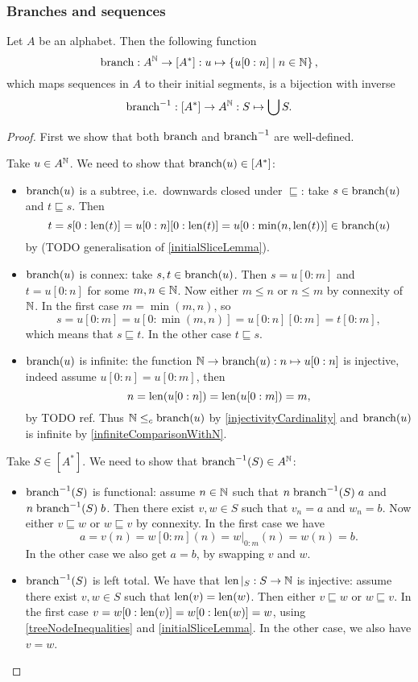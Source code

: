 \subsubsection{Branches and sequences}
\begin{proposition}
Let $A$ be an alphabet. Then the following function
\[ \operatorname{branch}: A^{\mathbb{N}} \to [A^*]: u \mapsto \left\{ u[0:n] \;\middle|\; n\in \mathbb{N} \right\}, \]
which maps sequences in $A$ to their initial segments, is a bijection with inverse
\[ \operatorname{branch}^{-1}: [A^*] \to A^{\mathbb{N}}: S\mapsto \bigcup S. \]
\end{proposition}
\begin{proof}
First we show that both $\operatorname{branch}$ and $\operatorname{branch}^{-1}$ are well-defined.

Take $u\in A^{\mathbb{N}}$. We need to show that $\operatorname{branch}(u)\in[A^*]$:
\begin{itemize}
\item $\operatorname{branch}(u)$ is a subtree, i.e.\ downwards closed under $\sqsubseteq$: take $s\in \operatorname{branch}(u)$ and $t\sqsubseteq s$. Then 
\[ t = s[0:\operatorname{len}(t)] = u[0:n][0:\operatorname{len}(t)] = u[0:\min(n, \operatorname{len}(t))] \in \operatorname{branch}(u) \]
by (TODO generalisation of \ref{initialSliceLemma}).
\item $\operatorname{branch}(u)$ is connex: take $s,t\in \operatorname{branch}(u)$. Then $s = u[0:m]$ and $t = u[0:n]$ for some $m,n\in \mathbb{N}$. Now either $m\leq n$ or $n\leq m$ by connexity of $\mathbb{N}$. In the first case $m = \min(m,n)$, so
\[ s = u[0:m] = u[0:\min(m,n)] = u[0:n][0:m] = t[0:m], \]
which means that $s\sqsubseteq t$. In the other case $t\sqsubseteq s$.
\item $\operatorname{branch}(u)$ is infinite: the function $\mathbb{N}\to \operatorname{branch}(u): n\mapsto u[0:n]$ is injective, indeed assume $u[0:n] = u[0:m]$, then
\[ n = \operatorname{len}(u[0:n]) = \operatorname{len}(u[0:m]) = m, \]
by TODO ref. Thus $\mathbb{N}\leq_c \operatorname{branch}(u)$ by \ref{injectivityCardinality} and $\operatorname{branch}(u)$ is infinite by \ref{infiniteComparisonWithN}.
\end{itemize}

Take $S\in [A^*]$. We need to show that $\operatorname{branch}^{-1}(S)\in A^{\mathbb{N}}$:
\begin{itemize}
\item $\operatorname{branch}^{-1}(S)$ is functional: assume $n\in \mathbb{N}$ such that $n\mathrel{\operatorname{branch}^{-1}(S)}a$ and $n\mathrel{\operatorname{branch}^{-1}(S)}b$. Then there exist $v,w\in S$ such that $v_n = a$ and $w_n = b$. Now either $v \sqsubseteq w$ or $w\sqsubseteq v$ by connexity. In the first case we have
\[ a = v(n) = w[0:m](n) = w|_{0:m}(n) = w(n) = b. \]
In the other case we also get $a=b$, by swapping $v$ and $w$.
\item $\operatorname{branch}^{-1}(S)$ is left total. We have that $\operatorname{len}|_S: S\to \mathbb{N}$ is injective: assume there exist $v,w\in S$ such that $\operatorname{len}(v) = \operatorname{len}(w)$. Then either $v\sqsubseteq w$ or $w\sqsubseteq v$. In the first case $v = w[0:\operatorname{len}(v)] = w[0:\operatorname{len}(w)] = w$, using \ref{treeNodeInequalities} and \ref{initialSliceLemma}. In the other case, we also have $v=w$. 


\end{itemize}
\end{proof}
